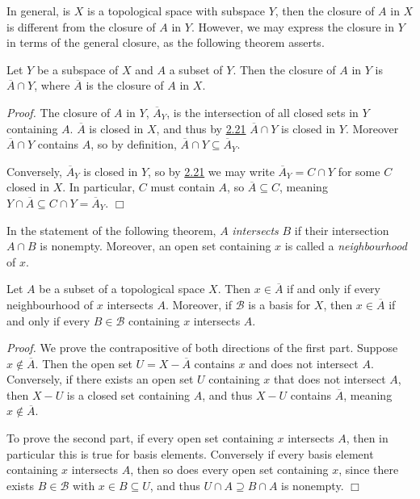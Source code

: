 In general, is $X$ is a topological space with subspace $Y$, then the closure of $A$ in $X$ is different from the closure of $A$ in $Y$. However, we may express the closure in $Y$ in terms of the general closure, as the following theorem asserts.
\begin{theorem}\label{2.24}
    Let $Y$ be a subspace of $X$ and $A$ a subset of $Y$. Then the closure of $A$ in $Y$ is $\overline{A} \cap Y$, where $\overline{A}$ is the closure of $A$ in $X$.
\end{theorem}
{\it Proof.} The closure of $A$ in $Y$, $\overline{A}_Y$, is the intersection of all closed sets in $Y$ containing $A$. $\overline{A}$ is closed in $X$, and thus by \hyperref[2.21]{2.21} $\overline{A} \cap Y$ is closed in $Y$. Moreover $\overline{A} \cap Y$ contains $A$, so by definition, $\overline{A} \cap Y \subseteq \overline{A}_Y$.

Conversely, $\overline{A}_Y$ is closed in $Y$, so by \hyperref[2.21]{2.21} we may write $\overline{A}_Y = C \cap Y$ for some $C$ closed in $X$. In particular, $C$ must contain $A$, so $\overline{A} \subseteq C$, meaning $Y \cap \overline{A} \subseteq C \cap Y = \overline{A}_Y$. $\Box$

In the statement of the following theorem, $A$ {\it intersects} $B$ if their intersection $A\cap B$ is nonempty. Moreover, an open set containing $x$ is called a {\it neighbourhood} of $x$.
\begin{theorem}\label{2.25}
    Let $A$ be a subset of a topological space $X$. Then $x \in \overline{A}$ if and only if every neighbourhood of $x$ intersects $A$. Moreover, if $\mathcal{B}$ is a basis for $X$, then $x \in \overline{A}$ if and only if every $B \in \mathcal{B}$ containing $x$ intersects $A$.
\end{theorem}
{\it Proof.} We prove the contrapositive of both directions of the first part. Suppose $x \notin \overline{A}$. Then the open set $U = X - \overline{A}$ contains $x$ and does not intersect $A$. Conversely, if there exists an open set $U$ containing $x$ that does not intersect $A$, then $X - U$ is a closed set containing $A$, and thus $X - U$ contains $\overline{A}$, meaning $x \notin \overline{A}$.

To prove the second part, if every open set containing $x$ intersects $A$, then in particular this is true for basis elements. Conversely if every basis element containing $x$ intersects $A$, then so does every open set containing $x$, since there exists $B \in \mathcal{B}$ with $x \in B \subseteq U$, and thus $U \cap A \supseteq B \cap A$ is nonempty. $\Box$


